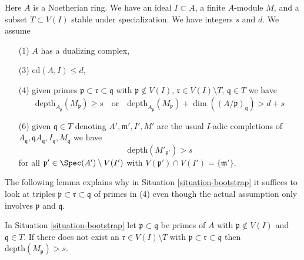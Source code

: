 \begin{situation}
\label{situation-bootstrap}
Here $A$ is a Noetherian ring. We have an ideal $I \subset A$,
a finite $A$-module $M$, and a subset $T \subset V(I)$ stable under
specialization. We have integers $s$ and $d$. We assume
\begin{enumerate}
\item[(1)] $A$ has a dualizing complex,
\item[(3)] $\text{cd}(A, I) \leq d$,
\item[(4)] given primes $\mathfrak p \subset \mathfrak r \subset \mathfrak q$
with $\mathfrak p \not \in V(I)$,
$\mathfrak r \in V(I) \setminus T$,
$\mathfrak q \in T$ we have
$$
\text{depth}_{A_\mathfrak p}(M_\mathfrak p) \geq s
\quad\text{or}\quad
\text{depth}_{A_\mathfrak p}(M_\mathfrak p) +
\dim((A/\mathfrak p)_\mathfrak q) > d + s
$$
\item[(6)] given $\mathfrak q \in T$ denoting
$A', \mathfrak m', I', M'$ are the usual $I$-adic completions
of $A_\mathfrak q, \mathfrak qA_\mathfrak q, I_\mathfrak q, M_\mathfrak q$
we have
$$
\text{depth}(M'_{\mathfrak p'}) > s
$$
for all $\mathfrak p' \in \Spec(A') \setminus V(I')$ with
$V(\mathfrak p') \cap V(I') = \{\mathfrak m'\}$.
\end{enumerate}
\end{situation}

\noindent
The following lemma explains why in Situation \ref{situation-bootstrap}
it suffices to look at triples
$\mathfrak p \subset \mathfrak r \subset \mathfrak q$ of primes in (4)
even though the actual assumption only involves $\mathfrak p$ and $\mathfrak q$.

\begin{lemma}
\label{lemma-helper-bootstrap}
In Situation \ref{situation-bootstrap} let $\mathfrak p \subset \mathfrak q$
be primes of $A$ with $\mathfrak p \not \in V(I)$ and
$\mathfrak q \in T$. If there does not exist an
$\mathfrak r \in V(I) \setminus T$ with
$\mathfrak p \subset \mathfrak r \subset \mathfrak q$
then $\text{depth}(M_\mathfrak p) > s$.
\end{lemma}

